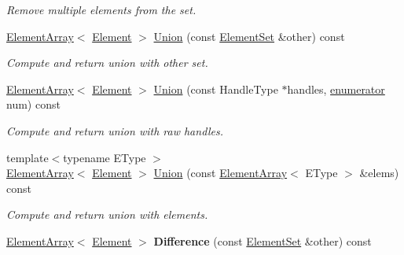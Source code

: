 \begin{DoxyCompactItemize}
\begin{DoxyCompactList}\small\item\em Remove multiple elements from the set. \end{DoxyCompactList}\item 
\hyperlink{classINMOST_1_1ElementArray}{Element\-Array}$<$ \hyperlink{classINMOST_1_1Element}{Element} $>$ \hyperlink{classINMOST_1_1ElementSet_a9d91f6c5139e8c0a0f31bf8543729bf4}{Union} (const \hyperlink{classINMOST_1_1ElementSet}{Element\-Set} \&other) const 
\begin{DoxyCompactList}\small\item\em Compute and return union with other set. \end{DoxyCompactList}\item 
\hyperlink{classINMOST_1_1ElementArray}{Element\-Array}$<$ \hyperlink{classINMOST_1_1Element}{Element} $>$ \hyperlink{classINMOST_1_1ElementSet_aba75cf7b89c6ae0b5ac41ad7f46c9df8}{Union} (const Handle\-Type $\ast$handles, \hyperlink{classINMOST_1_1Storage_ae333dfced6fa9cfde0c8e7dcf1b0cc2b}{enumerator} num) const 
\begin{DoxyCompactList}\small\item\em Compute and return union with raw handles. \end{DoxyCompactList}\item 
\hypertarget{classINMOST_1_1ElementSet_ab1ef60891bc6e6e8c095065843b51217}{{\footnotesize template$<$typename E\-Type $>$ }\\\hyperlink{classINMOST_1_1ElementArray}{Element\-Array}$<$ \hyperlink{classINMOST_1_1Element}{Element} $>$ \hyperlink{classINMOST_1_1ElementSet_ab1ef60891bc6e6e8c095065843b51217}{Union} (const \hyperlink{classINMOST_1_1ElementArray}{Element\-Array}$<$ E\-Type $>$ \&elems) const }\label{classINMOST_1_1ElementSet_ab1ef60891bc6e6e8c095065843b51217}

\begin{DoxyCompactList}\small\item\em Compute and return union with elements. \end{DoxyCompactList}\item 
\hypertarget{classINMOST_1_1ElementSet_a8e28cfda634eec4ffcf892209bf9899a}{\hyperlink{classINMOST_1_1ElementArray}{Element\-Array}$<$ \hyperlink{classINMOST_1_1Element}{Element} $>$ {\bfseries Difference} (const \hyperlink{classINMOST_1_1ElementSet}{Element\-Set} \&other) const }\label{classINMOST_1_1ElementSet_a8e28cfda634eec4ffcf892209bf9899a}


\end{DoxyCompactItemize}
